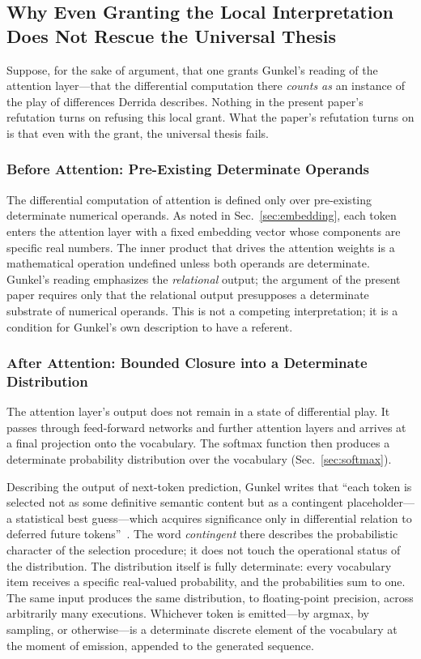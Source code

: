 \documentclass[a4paper,twocolumn,11pt]{article}
\begin{document}
\subsection{Why Even Granting the Local Interpretation Does Not Rescue the Universal Thesis}

Suppose, for the sake of argument, that one grants Gunkel's reading of the attention layer---that the differential computation there \emph{counts as} an instance of the play of differences Derrida describes. Nothing in the present paper's refutation turns on refusing this local grant. What the paper's refutation turns on is that even with the grant, the universal thesis fails.

\subsubsection{Before Attention: Pre-Existing Determinate Operands}

The differential computation of attention is defined only over pre-existing determinate numerical operands. As noted in Sec.~\ref{sec:embedding}, each token enters the attention layer with a fixed embedding vector whose components are specific real numbers. The inner product that drives the attention weights is a mathematical operation undefined unless both operands are determinate. Gunkel's reading emphasizes the \emph{relational} output; the argument of the present paper requires only that the relational output presupposes a determinate substrate of numerical operands. This is not a competing interpretation; it is a condition for Gunkel's own description to have a referent.

\subsubsection{After Attention: Bounded Closure into a Determinate Distribution}

The attention layer's output does not remain in a state of differential play. It passes through feed-forward networks and further attention layers and arrives at a final projection onto the vocabulary. The softmax function then produces a determinate probability distribution over the vocabulary (Sec.~\ref{sec:softmax}).

Describing the output of next-token prediction, Gunkel writes that ``each token is selected not as some definitive semantic content but as a contingent placeholder---a statistical best guess---which acquires significance only in differential relation to deferred future tokens''~\cite[\S 3.2]{Gunkel2025}. The word \emph{contingent} there describes the probabilistic character of the selection procedure; it does not touch the operational status of the distribution. The distribution itself is fully determinate: every vocabulary item receives a specific real-valued probability, and the probabilities sum to one. The same input produces the same distribution, to floating-point precision, across arbitrarily many executions. Whichever token is emitted---by argmax, by sampling, or otherwise---is a determinate discrete element of the vocabulary at the moment of emission, appended to the generated sequence.
\end{document}
